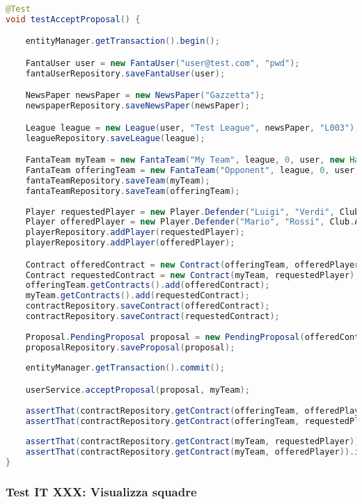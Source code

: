 \begin{lstlisting}[language=Java]
@Test
void testAcceptProposal() {

	entityManager.getTransaction().begin();

	FantaUser user = new FantaUser("user@test.com", "pwd");
	fantaUserRepository.saveFantaUser(user);

	NewsPaper newsPaper = new NewsPaper("Gazzetta");
	newspaperRepository.saveNewsPaper(newsPaper);

	League league = new League(user, "Test League", newsPaper, "L003");
	leagueRepository.saveLeague(league);

	FantaTeam myTeam = new FantaTeam("My Team", league, 0, user, new HashSet<>());
	FantaTeam offeringTeam = new FantaTeam("Opponent", league, 0, user, new HashSet<>());
	fantaTeamRepository.saveTeam(myTeam);
	fantaTeamRepository.saveTeam(offeringTeam);
		
	Player requestedPlayer = new Player.Defender("Luigi", "Verdi", Club.BOLOGNA);
	Player offeredPlayer = new Player.Defender("Mario", "Rossi", Club.ATALANTA);
	playerRepository.addPlayer(requestedPlayer);
	playerRepository.addPlayer(offeredPlayer);

	Contract offeredContract = new Contract(offeringTeam, offeredPlayer);
	Contract requestedContract = new Contract(myTeam, requestedPlayer);
	offeringTeam.getContracts().add(offeredContract);
	myTeam.getContracts().add(requestedContract);
	contractRepository.saveContract(offeredContract);
	contractRepository.saveContract(requestedContract);
		
	Proposal.PendingProposal proposal = new PendingProposal(offeredContract, requestedContract);
	proposalRepository.saveProposal(proposal);
		
	entityManager.getTransaction().commit();

	userService.acceptProposal(proposal, myTeam);
		
	assertThat(contractRepository.getContract(offeringTeam, offeredPlayer)).isEmpty();
	assertThat(contractRepository.getContract(offeringTeam, requestedPlayer)).isPresent();
		
	assertThat(contractRepository.getContract(myTeam, requestedPlayer)).isEmpty();
	assertThat(contractRepository.getContract(myTeam, offeredPlayer)).isPresent();
}
\end{lstlisting}


\subsubsection{Test IT XXX: Visualizza squadre}


